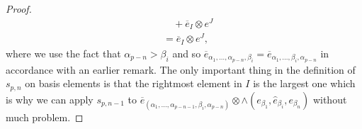 \begin{proof}
\begin{align*}
                                                                            &\quad + \overline{e}_{I} \otimes e^{J} \\
                                                                            &= \overline{e}_{I} \otimes e^{J},
  \end{align*}
  where we use the fact that $ \alpha_{p - n} > \beta_i $ and so $ \overline{e}_{\alpha_1, \ldots, \alpha_{p - n}, \beta_i} = \overline{e}_{\alpha_1, \ldots, \beta_i, \alpha_{p - n}} $ in accordance with an earlier remark. The only important thing in the definition of $ s_{p, n} $ on basis elements is that the rightmost element in $ I $ is the largest one which is why we can apply $ s_{p, n-1} $ to $ \overline{e}_{(\alpha_1, \ldots, \alpha_{p -n - 1}, \beta_i, \alpha_{p -n})} \otimes \wedge \left( e_{\beta_1}, \widehat{e}_{\beta_i}, e_{\beta_n} \right) $ without much problem.


\end{proof}
